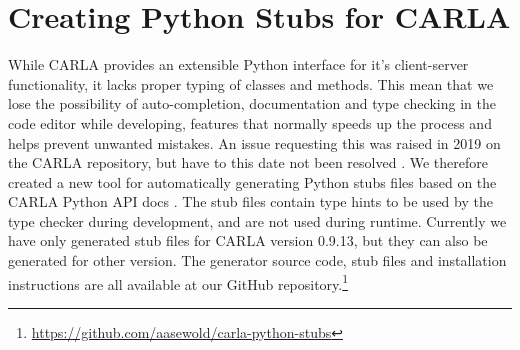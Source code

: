 \section{Creating Python Stubs for CARLA}
While CARLA provides an extensible Python interface for it's client-server functionality, it lacks proper typing of classes and methods. This mean that we lose the possibility of auto-completion, documentation and type checking in the code editor while developing, features that normally speeds up the process and helps prevent unwanted mistakes. An issue requesting this was raised in 2019 on the CARLA repository, but have to this date not been resolved \cite{carla-python-stubs-issue}. We therefore created a new tool for automatically generating Python stubs files based on the CARLA Python API docs \cite{carla-python-api}. The stub files contain type hints to be used by the type checker during development, and are not used during runtime. Currently we have only generated stub files for CARLA version 0.9.13, but they can also be generated for other version. The generator source code, stub files and installation instructions are all available at our GitHub repository.\footnote{\url{https://github.com/aasewold/carla-python-stubs}}
